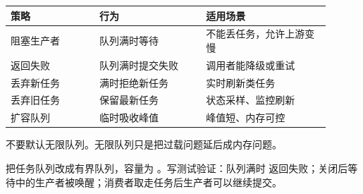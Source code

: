 \begin{longtable}{p{0.25\linewidth}p{0.30\linewidth}p{0.35\linewidth}}
\toprule
策略 & 行为 & 适用场景 \\
\midrule
阻塞生产者 & 队列满时等待 & 不能丢任务，允许上游变慢 \\
返回失败 & 队列满时提交失败 & 调用者能降级或重试 \\
丢弃新任务 & 满时拒绝新任务 & 实时刷新类任务 \\
丢弃旧任务 & 保留最新任务 & 状态采样、监控刷新 \\
扩容队列 & 临时吸收峰值 & 峰值短、内存可控 \\
\bottomrule
\end{longtable}

不要默认无限队列。无限队列只是把过载问题延后成内存问题。

\begin{exercisebox}
把任务队列改成有界队列，容量为 。写测试验证：队列满时  返回失败；关闭后等待中的生产者被唤醒；消费者取走任务后生产者可以继续提交。
\end{exercisebox}
